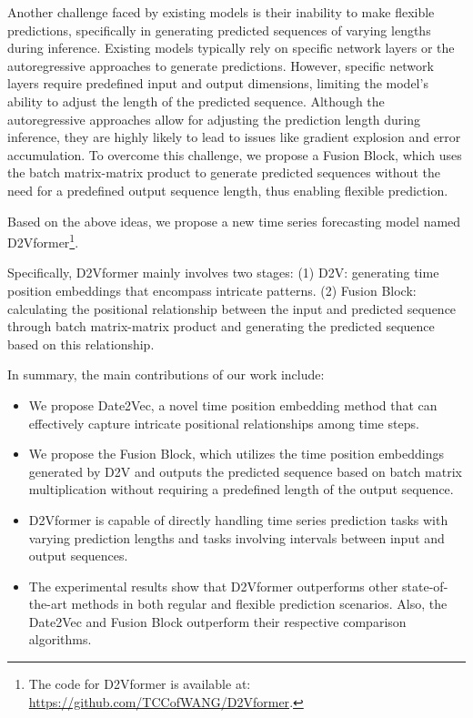 \documentclass{article}
\begin{document}
Another challenge faced by existing models is their inability to make flexible predictions, specifically in generating predicted sequences of varying lengths during inference. 
Existing models typically rely on specific network layers\cite{informer,autoformer,fedformer} or the autoregressive approaches\cite{gru,lstm_1} to generate predictions. 
However, specific network layers require predefined input and output dimensions, limiting the model's ability to adjust the length of the predicted sequence. Although the autoregressive approaches allow for adjusting the prediction length during inference, they are highly likely to lead to issues like gradient explosion\cite{lstm_2,lstm_3} and error accumulation\cite{error_accumulation_1,error_accumulation_2}. To overcome this challenge, we propose a Fusion Block, which uses the batch matrix-matrix product to generate predicted sequences without the need for a predefined output sequence length, thus enabling flexible prediction.

Based on the above ideas, we propose a new time series forecasting model named D2Vformer\footnote{The code for D2Vformer is available at: \url{https://github.com/TCCofWANG/D2Vformer}.}. 

Specifically, D2Vformer mainly involves two stages: (1) D2V: generating time position embeddings that encompass intricate patterns. (2) Fusion Block: calculating the positional relationship between the input and predicted sequence through batch matrix-matrix product and generating the predicted sequence based on this relationship.
  
In summary, the main contributions of our work include:
\begin{itemize}
  \item  We propose Date2Vec, a novel time position embedding method that can effectively capture intricate positional relationships among time steps.

  \item  We propose the Fusion Block, which utilizes the time position embeddings generated by D2V and outputs the predicted sequence based on batch matrix multiplication without requiring a predefined length of the output sequence.

  \item  D2Vformer is capable of directly handling time series prediction tasks with varying prediction lengths and tasks involving intervals between input and output sequences.
  
  \item The experimental results show that D2Vformer outperforms other state-of-the-art methods in both regular and flexible prediction scenarios. Also, the Date2Vec and Fusion Block outperform their respective comparison algorithms.
\end{itemize}
\end{document}
